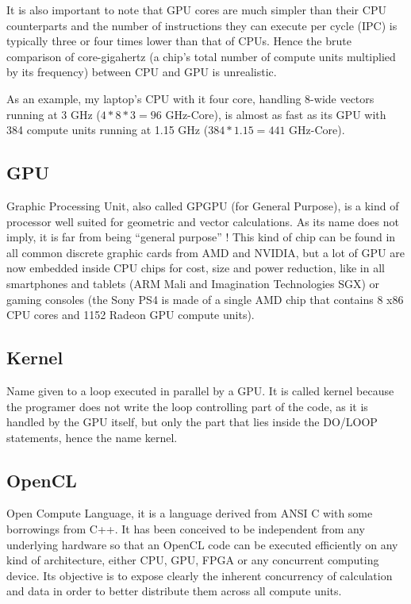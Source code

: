 \documentclass[a4paper,12pt]{article}
\begin{document}
It is also important to note that GPU cores are much simpler than their CPU counterparts and the number of instructions they can execute per cycle (IPC) is typically three or four times lower than that of CPUs. Hence the brute comparison of core-gigahertz (a chip's total number of compute units multiplied by its frequency) between CPU and GPU is unrealistic.

As an example, my laptop's CPU with it four core, handling 8-wide vectors running at 3 GHz ($4*8*3=96$ GHz-Core), is almost as fast as its GPU with 384 compute units running at 1.15 GHz ($384*1.15=441$ GHz-Core).

\subsection{GPU}
Graphic Processing Unit, also called GPGPU (for General Purpose), is a kind of processor well suited for geometric and vector calculations. As its name does not imply, it is far from being ``general purpose'' ! This kind of chip can be found in all common discrete graphic cards from AMD and NVIDIA, but a lot of GPU are now embedded inside CPU chips for cost, size and power reduction, like in all smartphones and tablets (ARM Mali and Imagination Technologies SGX) or gaming consoles (the Sony PS4 is made of a single AMD chip that contains 8 x86 CPU cores and 1152 Radeon GPU compute units).

\subsection{Kernel}
Name given to a loop executed in parallel by a GPU. It is called kernel because the programer does not write the loop controlling part of the code, as it is handled by the GPU itself, but only the part that lies inside the DO/LOOP statements, hence the name kernel.

\subsection{OpenCL}
Open Compute Language, it is a language derived from ANSI C with some borrowings from C++. It has been conceived to be independent from any underlying hardware so that an OpenCL code can be executed efficiently on any kind of architecture, either CPU, GPU, FPGA or any concurrent computing device. Its objective is to expose clearly the inherent concurrency of calculation and data in order to better distribute them across all compute units.
\end{document}
